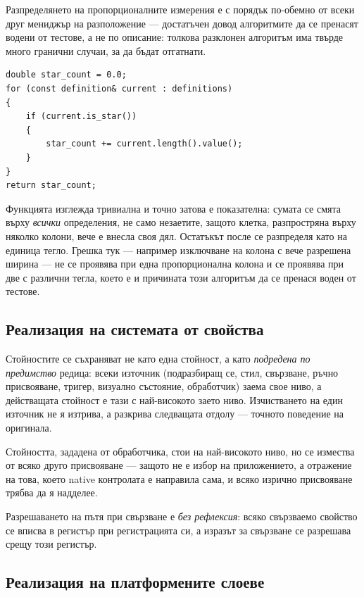 Разпределянето на пропорционалните измерения е с порядък по-обемно от всеки друг мениджър
на разположение --- достатъчен довод алгоритмите да се пренасят водени от тестове, а не по
описание: толкова разклонен алгоритъм има твърде много гранични случаи, за да бъдат
отгатнати.

\begin{lstlisting}[caption={Сумиране на теглата на пропорционалните измерения},label={lst:grid_stars}]
double star_count = 0.0;
for (const definition& current : definitions)
{
    if (current.is_star())
    {
        star_count += current.length().value();
    }
}
return star_count;
\end{lstlisting}

Функцията изглежда тривиална и точно затова е показателна: сумата се смята върху
\emph{всички} определения, не само незаетите, защото клетка, разпростряна върху няколко
колони, вече е внесла своя дял. Остатъкът после се разпределя като  на единица тегло. Грешка тук --- например изключване на колона с вече
разрешена ширина --- не се проявява при една пропорционална колона и се проявява при две с
различни тегла, което е и причината този алгоритъм да се пренася воден от тестове.

\subsection{Реализация на системата от свойства}
\label{subsec:binding_impl}

Стойностите се съхраняват не като една стойност, а като \emph{подредена по предимство}
редица: всеки източник (подразбиращ се, стил, свързване, ръчно присвояване, тригер,
визуално състояние, обработчик) заема свое ниво, а действащата стойност е тази с
най-високото заето ниво. Изчистването на един източник не я изтрива, а разкрива следващата
отдолу --- точното поведение на оригинала.

Стойността, зададена от обработчика, стои на най-високото ниво, но се измества от всяко
друго присвояване --- защото не е избор на приложението, а отражение на това, което native
контролата е направила сама, и всяко изрично присвояване трябва да я надделее.

Разрешаването на пътя при свързване е \emph{без рефлексия}: всяко свързваемо свойство се
вписва в регистър при регистрацията си, а изразът за свързване се разрешава срещу този
регистър.

\subsection{Реализация на платформените слоеве}
\label{subsec:platform_impl}

